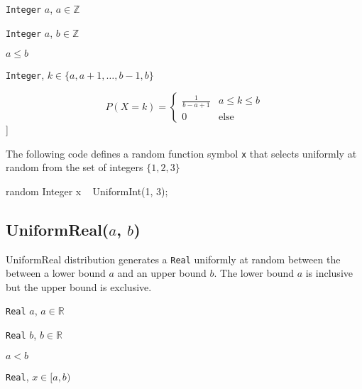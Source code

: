 \begin{itemize*}
\item[] \verb|Integer| $a$, $a \in \mathbb{Z}$
\item[] \verb|Integer| $a$, $b \in \mathbb{Z}$
\item[] $a \leq b$
 
\end{itemize*}

\begin{itemize*}
\item[] \verb|Integer|, $k \in \{a, a+1, \ldots, b-1, b \}$ 
\end{itemize*}

\[
	P(X = k) = \left\{
		  \begin{array}{lr}
		    \frac{1}{b - a + 1} & a \leq k \leq b \\
		    0 					& \text{else}
		  \end{array}
		\right.
\]]

The following code defines a random function symbol \verb|x| that selects uniformly at random from the set of integers $\{1, 2, 3\}$

\begin{blogcode}
random Integer x ~ UniformInt(1, 3);
\end{blogcode}

\subsection{UniformReal($a$, $b$)}

UniformReal distribution generates a \verb|Real| uniformly at random between the between a lower bound $a$ and an upper bound $b$. The lower bound $a$ is inclusive but the upper bound is exclusive.

\begin{itemize*}
\item[] \verb|Real| $a$, $a \in \mathbb{R}$
\item[] \verb|Real| $b$, $b \in \mathbb{R}$
\item[] $a < b$
 
\end{itemize*}

\begin{itemize*}
\item[] \verb|Real|, $x \in [a, b)$ 
\end{itemize*}

